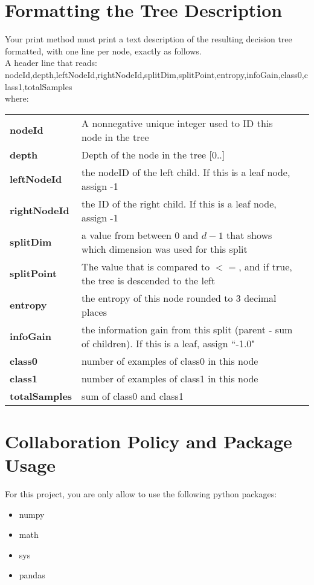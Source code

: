 \documentclass[11pt,letterpaper]{article}
\begin{document}
\vspace{0.25 cm}

\newpage 

\section*{Formatting the Tree Description}
Your print method must print a text description of the resulting decision tree formatted, with one 
line per node, exactly as follows.\\
A header line that reads: \\
\vspace{0,25 cm}
\hspace{1 cm} nodeId,depth,leftNodeId,rightNodeId,splitDim,splitPoint,entropy,infoGain,class0,class1,totalSamples\\
where: \\
\begin{tabular}{l p{14 cm}l}
{\bf nodeId} & A nonnegative unique integer used to ID this node in the tree \\
{\bf depth}    & Depth of the node in the tree  [0..] \\
{\bf leftNodeId}    & the nodeID of the left child.  If this is a leaf node, assign -1 \\
{\bf rightNodeId}  & the ID of the right child.  If this is a leaf node, assign -1 \\
{\bf splitDim} & a value from between $0$ and $d-1$ that shows which dimension was used for this split \\
{\bf splitPoint} & The value that is compared to $<=$, and if true, the tree is descended to the left \\
{\bf entropy} & the entropy of this node rounded to 3 decimal places \\
{\bf infoGain} & the information gain from this split (parent - sum of children).  If this is a leaf, assign ``-1.0" \\
{\bf class0} & number of examples of class0 in this node \\
{\bf class1} & number of examples of class1 in this node \\
{\bf totalSamples} & sum of class0 and class1 \\
\end{tabular}

\section*{Collaboration Policy and Package Usage}
For this project, you are only allow to use the following python packages:
\begin{itemize}
\item numpy
\item math
\item sys
\item pandas
\end{itemize}
\end{document}
